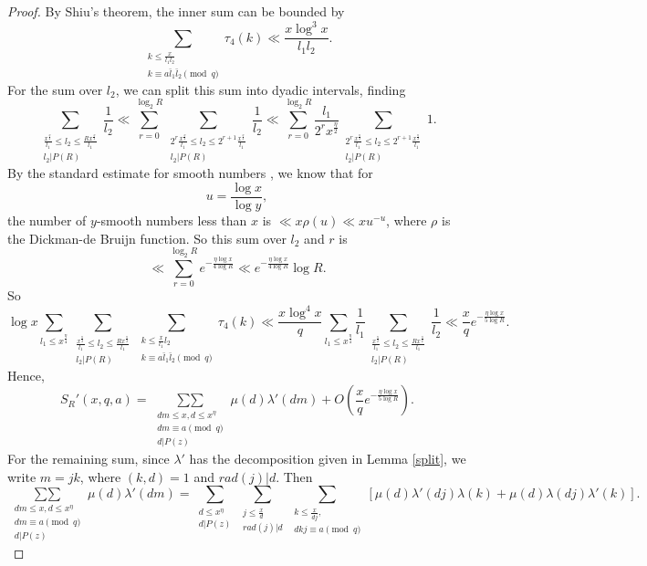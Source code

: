 \documentclass{amsart}
\begin{document}
\begin{proof}
By Shiu's theorem, the inner sum can be bounded by
$$\mathop{\sum}\limits_{\substack{k\leq \frac x{l_1l_2} \\ k\equiv a\bar l_1\bar l_2\pmod q }}\tau_4(k)\ll \frac{x\log^3 x}{l_1l_2}.$$
For the sum over $l_2$, we can split this sum into dyadic intervals, finding
$$\sum_{\substack{\frac{x^\frac \eta 2}{l_1}\leq l_2\leq \frac{Rx^\frac \eta 2}{l_1} \\ l_2|P(R)}}\frac{1}{l_2}\ll \sum_{r=0}^{\log_2R}\sum_{\substack{2^r\frac{x^\frac \eta 2}{l_1}\leq l_2\leq 2^{r+1}\frac{x^\frac \eta 2}{l_1} \\ l_2|P(R)}}\frac{1}{l_2}\ll \sum_{r=0}^{\log_2R}\frac{l_1}{2^rx^\frac \eta 2}\sum_{\substack{2^r\frac{x^\frac \eta 2}{l_1}\leq l_2\leq 2^{r+1}\frac{x^\frac \eta 2}{l_1} \\ l_2|P(R)}}1. $$
By the standard estimate for smooth numbers \cite{Di}, we know that for
$$u=\frac{\log x}{\log y},$$
the number of $y$-smooth numbers less than $x$ is $\ll x\rho(u)\ll xu^{-u}$, where $\rho$ is the Dickman-de Bruijn function. So this sum over $l_2$ and $r$ is
$$\ll \sum_{r=0}^{\log_2R}e^{-\frac{\eta\log x}{4\log R}}\ll e^{-\frac{\eta\log x}{4\log R}}\log R. $$
So
$$\log x\sum_{l_1\leq x^{\frac \eta 4}}\sum_{\substack{\frac{x^\frac \eta 2}{l_1}\leq l_2\leq \frac{Rx^\frac \eta 2}{l_1} \\ l_2|P(R)}}\mathop{\sum}\limits_{\substack{k\leq \frac x{l_1}{l_2} \\ k\equiv a\bar l_1\bar l_2\pmod q }}\tau_4(k)\ll \frac{x\log^4 x}{q}\sum_{l_1\leq x^{\frac \eta 4}}\frac{1}{l_1}\sum_{\substack{\frac{x^\frac \eta 2}{l_1}\leq l_2\leq \frac{Rx^\frac \eta 2}{l_1} \\ l_2|P(R)}}\frac{1}{l_2}\ll \frac xqe^{-\frac{\eta\log x}{5\log R}}.$$
Hence,
$$S_R'(x,q,a)=\mathop{\sum\sum}\limits_{\substack{dm\leq x,d\leq x^\eta \\ dm\equiv a\pmod q \\ d|P(z)}}\mu(d)\lambda'(dm)+O\left(\frac{x}{q}e^{-\frac{\eta\log x}{5\log R}}\right).$$
For the remaining sum, since $\lambda'$ has the decomposition given in Lemma \ref{split}, we write $m=jk$, where $(k,d)=1$ and $rad(j)|d$.  Then
$$\mathop{\sum\sum}\limits_{\substack{dm\leq x,d\leq x^\eta \\ dm\equiv a\pmod q \\ d|P(z)}}\mu(d)\lambda'(dm)=\sum_{\substack{d\leq x^\eta \\ d|P(z)}}\sum_{\substack{j\leq \frac xd \\ rad(j)|d}}\mathop{\sum}\limits_{\substack{k\leq \frac{x}{dj},\\ dkj\equiv a\pmod q }}[\mu(d)\lambda'(dj)\lambda(k)+\mu(d)\lambda(dj)\lambda'(k)].$$

\end{proof}
\end{document}
